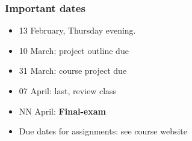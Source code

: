 \begin{frame}\frametitle{Important dates}
	\begin{itemize}
		\item	13 February, Thursday evening. {\color{myOrange}{Notify my of clashes this week!}}
		\item	10 March: project outline due
		\item	31 March: course project due
		\item	07 April: last, review class
		\item	NN April: \textbf{Final-exam}
	\end{itemize}
	\begin{itemize}
		\item	Due dates for assignments: see course website
	\end{itemize}
\end{frame}